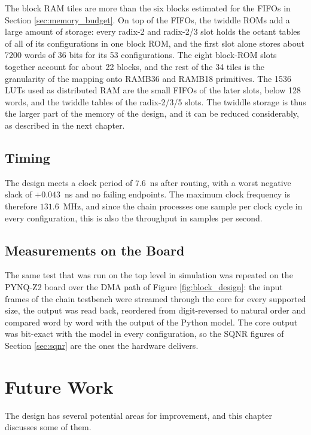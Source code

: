\documentclass[a4paper,12pt, master]{etf}
\begin{document}
The block RAM tiles are more than the six blocks estimated for the FIFOs in Section \ref{sec:memory_budget}. On top of the FIFOs, the twiddle ROMs add a large amount of storage: every radix-2 and radix-2/3 slot holds the octant tables of all of its configurations in one block ROM, and the first slot alone stores about 7200 words of 36 bits for its 53 configurations. The eight block-ROM slots together account for about 22 blocks, and the rest of the 34 tiles is the granularity of the mapping onto RAMB36 and RAMB18 primitives. The 1536 LUTs used as distributed RAM are the small FIFOs of the later slots, below 128 words, and the twiddle tables of the radix-2/3/5 slots. The twiddle storage is thus the larger part of the memory of the design, and it can be reduced considerably, as described in the next chapter.

\section{Timing}

The design meets a clock period of $7.6$~ns after routing, with a worst negative slack of $+0.043$~ns and no failing endpoints. The maximum clock frequency is therefore $131.6$~MHz, and since the chain processes one sample per clock cycle in every configuration, this is also the throughput in samples per second.

\section{Measurements on the Board}

The same test that was run on the top level in simulation was repeated on the PYNQ-Z2 board over the DMA path of Figure \ref{fig:block_design}: the input frames of the chain testbench were streamed through the core for every supported size, the output was read back, reordered from digit-reversed to natural order and compared word by word with the output of the Python model. The core output was bit-exact with the model in every configuration, so the SQNR figures of Section \ref{sec:sqnr} are the ones the hardware delivers.

\chapter{Future Work}
\label{chap:future_work}

The design has several potential areas for improvement, and this chapter discusses some of them.
\end{document}
